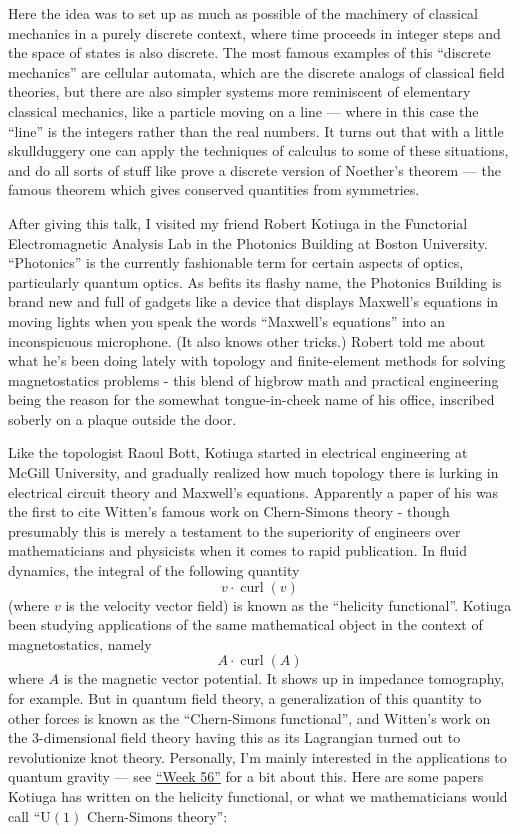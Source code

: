 \documentclass{article}
\begin{document}
Here the idea was to set up as much as possible of the machinery of
classical mechanics in a purely discrete context, where time proceeds in
integer steps and the space of states is also discrete. The most famous
examples of this ``discrete mechanics'' are cellular automata, which are
the discrete analogs of classical field theories, but there are also
simpler systems more reminiscent of elementary classical mechanics, like
a particle moving on a line --- where in this case the ``line'' is the
integers rather than the real numbers. It turns out that with a little
skullduggery one can apply the techniques of calculus to some of these
situations, and do all sorts of stuff like prove a discrete version of
Noether's theorem --- the famous theorem which gives conserved
quantities from symmetries.

After giving this talk, I visited my friend Robert Kotiuga in the
Functorial Electromagnetic Analysis Lab in the Photonics Building at
Boston University. ``Photonics'' is the currently fashionable term for
certain aspects of optics, particularly quantum optics. As befits its
flashy name, the Photonics Building is brand new and full of gadgets
like a device that displays Maxwell's equations in moving lights when
you speak the words ``Maxwell's equations'' into an inconspicuous
microphone. (It also knows other tricks.) Robert told me about what he's
been doing lately with topology and finite-element methods for solving
magnetostatics problems - this blend of higbrow math and practical
engineering being the reason for the somewhat tongue-in-cheek name of
his office, inscribed soberly on a plaque outside the door.

Like the topologist Raoul Bott, Kotiuga started in electrical
engineering at McGill University, and gradually realized how much
topology there is lurking in electrical circuit theory and Maxwell's
equations. Apparently a paper of his was the first to cite Witten's
famous work on Chern-Simons theory - though presumably this is merely a
testament to the superiority of engineers over mathematicians and
physicists when it comes to rapid publication. In fluid dynamics, the
integral of the following quantity \[v\cdot\operatorname{curl}(v)\]
(where \(v\) is the velocity vector field) is known as the ``helicity
functional''. Kotiuga been studying applications of the same
mathematical object in the context of magnetostatics, namely
\[A\cdot\operatorname{curl}(A)\] where \(A\) is the magnetic vector
potential. It shows up in impedance tomography, for example. But in
quantum field theory, a generalization of this quantity to other forces
is known as the ``Chern-Simons functional'', and Witten's work on the
3-dimensional field theory having this as its Lagrangian turned out to
revolutionize knot theory. Personally, I'm mainly interested in the
applications to quantum gravity --- see
\protect\hyperlink{week56}{``Week 56''} for a bit about this. Here are
some papers Kotiuga has written on the helicity functional, or what we
mathematicians would call ``\(\mathrm{U}(1)\) Chern-Simons theory'':
\end{document}
